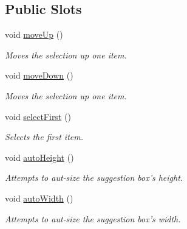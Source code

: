 \subsection*{Public Slots}
\begin{DoxyCompactItemize}
\item 
\hypertarget{class_command_suggestion_list_a8f033cd908b50fa9cc3383899f515943}{void \hyperlink{class_command_suggestion_list_a8f033cd908b50fa9cc3383899f515943}{move\-Up} ()}\label{class_command_suggestion_list_a8f033cd908b50fa9cc3383899f515943}

\begin{DoxyCompactList}\small\item\em Moves the selection up one item. \end{DoxyCompactList}\item 
\hypertarget{class_command_suggestion_list_a0df4ac65c3dc9db721b111d049330b64}{void \hyperlink{class_command_suggestion_list_a0df4ac65c3dc9db721b111d049330b64}{move\-Down} ()}\label{class_command_suggestion_list_a0df4ac65c3dc9db721b111d049330b64}

\begin{DoxyCompactList}\small\item\em Moves the selection up one item. \end{DoxyCompactList}\item 
\hypertarget{class_command_suggestion_list_abdfc24c738389f63440679e786328bb5}{void \hyperlink{class_command_suggestion_list_abdfc24c738389f63440679e786328bb5}{select\-First} ()}\label{class_command_suggestion_list_abdfc24c738389f63440679e786328bb5}

\begin{DoxyCompactList}\small\item\em Selects the first item. \end{DoxyCompactList}\item 
\hypertarget{class_command_suggestion_list_a5bbb5dc0289d336d123e852c0b4323c9}{void \hyperlink{class_command_suggestion_list_a5bbb5dc0289d336d123e852c0b4323c9}{auto\-Height} ()}\label{class_command_suggestion_list_a5bbb5dc0289d336d123e852c0b4323c9}

\begin{DoxyCompactList}\small\item\em Attempts to aut-\/size the suggestion box's height. \end{DoxyCompactList}\item 
\hypertarget{class_command_suggestion_list_a8b9a9ca017e2507b43fb55cd7e2584dd}{void \hyperlink{class_command_suggestion_list_a8b9a9ca017e2507b43fb55cd7e2584dd}{auto\-Width} ()}\label{class_command_suggestion_list_a8b9a9ca017e2507b43fb55cd7e2584dd}

\begin{DoxyCompactList}\small\item\em Attempts to aut-\/size the suggestion box's width. \end{DoxyCompactList}\end{DoxyCompactItemize}
